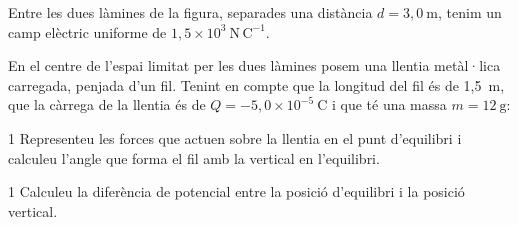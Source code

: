 Entre les dues làmines de la figura, separades una distància $d = 3,0\ \mathrm{m}$, tenim un camp elèctric uniforme de $1,5\times 10^{3}\ \mathrm{N\,C^{-1}}$.


En el centre de l'espai limitat per les dues làmines posem una llentia metàl·lica carregada, penjada d'un fil. Tenint en compte que la longitud del fil és de 1,5~m, que la càrrega de la llentia és de $Q = -5,0\times 10^{-5}\ \mathrm{C}$ i que té una massa $m = 12\ \mathrm{g}$:

\begin{apartat}{1}
Representeu les forces que actuen sobre la llentia en el punt d'equilibri i calculeu l'angle que forma el fil amb la vertical en l'equilibri.
\end{apartat}

\begin{apartat}{1}
Calculeu la diferència de potencial entre la posició d'equilibri i la posició vertical.
\end{apartat}
